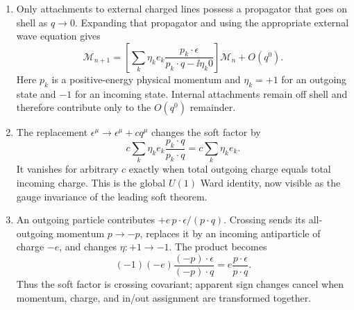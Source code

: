 \begin{enumerate}
\begin{enumerate}
\item
Only attachments to external charged lines possess a propagator that goes
on shell as \(q\to0\).  Expanding that propagator and using the appropriate
external wave equation gives
\[
 \mathcal M_{n+1}=
 \left[\sum_k\eta_ke_k
 \frac{p_k\cdot\epsilon}{p_k\cdot q-\ii\eta_k0}\right]\mathcal M_n
 +O(q^0).
\]
Here \(p_k\) is a positive-energy physical momentum and
\(\eta_k=+1\) for an outgoing state and \(-1\) for an incoming state.
Internal attachments remain off shell and therefore contribute only to
the \(O(q^0)\) remainder.
\item
The replacement \(\epsilon^\mu\to\epsilon^\mu+cq^\mu\) changes the soft
factor by
\[
 c\sum_k\eta_ke_k\frac{p_k\cdot q}{p_k\cdot q}
 =c\sum_k\eta_ke_k.
\]
It vanishes for arbitrary \(c\) exactly when total outgoing charge equals
total incoming charge.  This is the global \(U(1)\) Ward identity, now
visible as the gauge invariance of the leading soft theorem.
\item
An outgoing particle contributes
\(+e\,p\cdot\epsilon/(p\cdot q)\).  Crossing sends its all-outgoing momentum
\(p\to-p\), replaces it by an incoming antiparticle of charge \(-e\), and
changes \(\eta:+1\to-1\).  The product becomes
\[
 (-1)(-e)\frac{(-p)\cdot\epsilon}{(-p)\cdot q}
 =e\frac{p\cdot\epsilon}{p\cdot q}.
\]
Thus the soft factor is crossing covariant; apparent sign changes cancel
when momentum, charge, and in/out assignment are transformed together.
\end{enumerate}


\end{enumerate}
